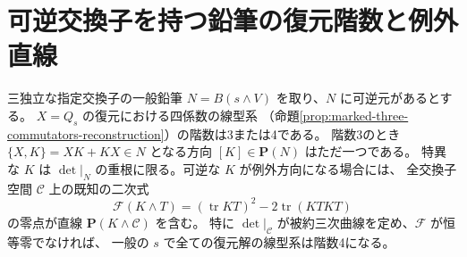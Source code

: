 \section{可逆交換子を持つ鉛筆の復元階数と例外直線}
\label{sec:marked-bracket-pencil-rank}
\begin{theorem}\label{thm:marked-bracket-pencil-rank}
三独立な指定交換子の一般鉛筆 $N=B(s\wedge V)$ を取り、$N$ に可逆元があるとする。
$X=Q_s$ の復元における四係数の線型系
（命題\ref{prop:marked-three-commutators-reconstruction}）の階数は3または4である。
階数3のとき $\{X,K\}=XK+KX\in N$ となる方向 $[K]\in\mathbf P(N)$ はただ一つである。
特異な $K$ は $\det|_N$ の重根に限る。可逆な $K$ が例外方向になる場合には、
全交換子空間 $\mathcal C$ 上の既知の二次式
\[
 \mathcal F(K\wedge T)=(\operatorname{tr} KT)^2-2\operatorname{tr}(KTKT)
\]
の零点が直線 $\mathbf P(K\wedge\mathcal C)$ を含む。
特に $\det|_{\mathcal C}$ が被約三次曲線を定め、$\mathcal F$ が恒等零でなければ、
一般の $s$ で全ての復元解の線型系は階数4になる。
\end{theorem}
